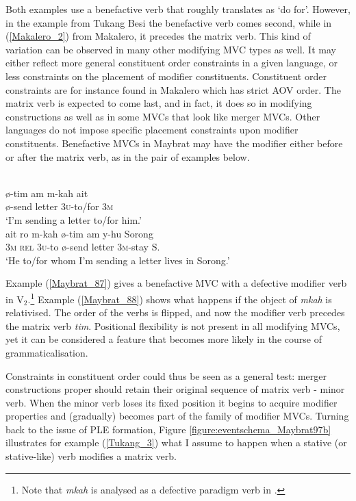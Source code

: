 Both examples use a benefactive verb that roughly translates as `do for'. However, in the example from Tukang Besi the benefactive verb comes second, while in (\ref{Makalero_2}) from Makalero, it precedes the matrix verb. This kind of variation can be observed in many other modifying MVC types as well. It may either reflect more general constituent order constraints in a given language, or less constraints on the placement of modifier constituents. Constituent order constraints are for instance found in Makalero which has strict AOV order. The matrix verb is expected to come last, and in fact, it does so in modifying constructions as well as in some  MVCs that look like merger MVCs. Other languages do not impose specific placement constraints upon modifier constituents. Benefactive MVCs in Maybrat may have the modifier either before or after the matrix verb, as in the pair of examples below.

\ea \label{Maybrat_87}
\\
\ea
\gll ø-tim am m-kah ait \\
ø-send letter 3\textsc{u}-to/for 3\textsc{m} \\
\glft `I'm sending a letter to/for him.'\\
\ex \label{Maybrat_88}
\gll ait ro m-kah ø-tim am y-hu Sorong\\
3\textsc{m} \textsc{rel} 3\textsc{u}-to ø-send letter 3\textsc{m}-stay S. \\
\glft `He to/for whom I'm sending a letter lives in Sorong.' \\ 
\z
\z

Example (\ref{Maybrat_87}) gives a benefactive MVC with a defective modifier verb in V$_2$.\footnote{Note that \textit{mkah} is analysed as a defective paradigm verb in \citet[80]{dol2007grammar}.} Example (\ref{Maybrat_88}) shows what happens if the object of \textit{mkah} is relativised. The order of the verbs is flipped, and now the modifier verb precedes the matrix verb \textit{tim}. Positional flexibility is not present in all modifying MVCs, yet it can be considered a feature that becomes more likely in the course of grammaticalisation.

Constraints in constituent order could thus be seen as a general test: merger constructions proper should retain their original sequence of matrix verb - minor verb. When the minor verb loses its fixed position it begins to acquire modifier properties and (gradually) becomes part of the family of modifier MVCs. Turning back to the issue of PLE formation, Figure \ref{figure:eventschema_Maybrat97b} illustrates for example (\ref{Tukang_3}) what I assume to happen when a stative (or stative-like) verb modifies a matrix verb.

